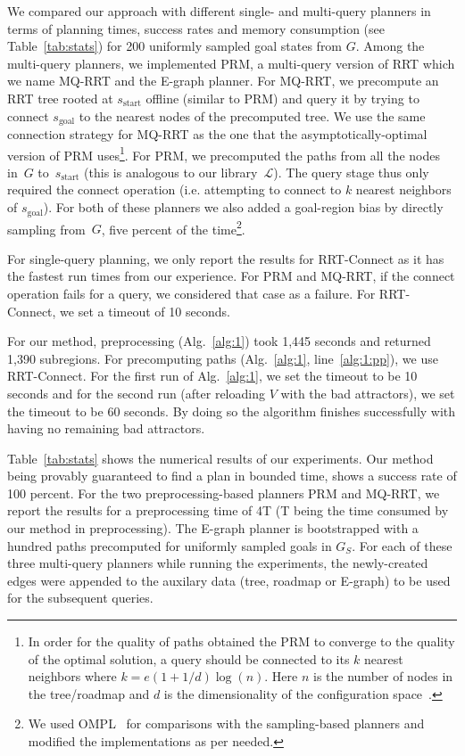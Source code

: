 \documentclass[letterpaper]{article} %
\newcommand{\calL}{\ensuremath{\mathcal{L}}\xspace}
\newcommand{\sStart}{\ensuremath{s_{\text{start}}\xspace}}
\newcommand{\sGoal}{\ensuremath{s_{\text{goal}}\xspace}}
\begin{document}
We compared our approach with different single- and multi-query planners in terms of planning times, success rates and memory consumption (see Table~\ref{tab:stats}) for 200 uniformly sampled goal states from $G$. Among the multi-query planners, we implemented \textsf{PRM}, a multi-query version of \textsf{RRT} which we name \textsf{MQ-RRT} and the \textsf{E-graph} planner. 
For \textsf{MQ-RRT}, we precompute an \textsf{RRT} tree rooted at  $\sStart$ offline (similar to \textsf{PRM}) and query it by trying to connect $\sGoal$ to the nearest nodes of the precomputed tree. We use the same connection strategy for \textsf{MQ-RRT} as the one that the asymptotically-optimal version of \textsf{PRM} uses\footnote{In order for the quality of paths obtained the \textsf{PRM} to converge to the quality of the optimal solution, a query should be connected to its $k$ nearest neighbors where 
$k = e(1+1/d)\log(n)$.
Here $n$ is the number of nodes in the tree/roadmap and $d$ is the dimensionality of the configuration space~\cite{karaman2011sampling,SSH16}. 
}.
For \textsf{PRM}, we precomputed the paths from all the nodes in~$G$ to~$s_{\text{start}}$ (this is analogous to our library~$\calL$). 
The query stage thus only required the connect operation (i.e. attempting to connect to $k$ nearest neighbors of $\sGoal$). For both of these planners we also added a goal-region bias by directly sampling from~$G$, five percent of the time\footnote{We used OMPL~\cite{SMK12} for comparisons with the sampling-based planners and modified the implementations as per needed.}. 

For single-query planning, we only report the results for \textsf{RRT-Connect} as it has the fastest run times from our experience. For \textsf{PRM} and \textsf{MQ-RRT}, if the connect operation fails for a query, we considered that case as a failure. For \textsf{RRT-Connect}, we set a timeout of 10 seconds.

For our method, preprocessing (Alg.~\ref{alg:1}) took 1,445 seconds and returned 1,390 subregions. For precomputing paths (Alg.~\ref{alg:1}, line~\ref{alg:1:pp}), we use \textsf{RRT-Connect}. For the first run of Alg.~\ref{alg:1}, we set the timeout to be 10 seconds and for the second run (after reloading $V$ with the bad attractors), we set the timeout to be 60 seconds. By doing so the algorithm finishes successfully with having no remaining bad attractors.

Table~\ref{tab:stats} shows the numerical results of our experiments. Our method being provably guaranteed to find a plan in bounded time, shows a success rate of 100 percent. For the two preprocessing-based planners \textsf{PRM} and \textsf{MQ-RRT}, we report the results for a preprocessing time of 4T (T being the time consumed by our method in preprocessing). The \textsf{E-graph} planner is bootstrapped with a hundred paths precomputed for uniformly sampled goals in $G_S$. For each of these three multi-query planners while running the experiments, the newly-created edges were appended to the auxilary data (tree, roadmap or \textsf{E-graph}) to be used for the subsequent queries.
\end{document}
